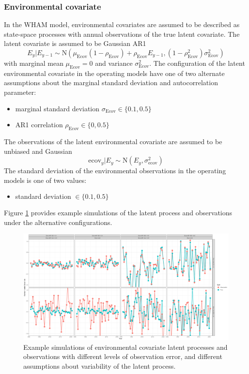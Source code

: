 \documentclass[
  12pt,
]{article}
\begin{document}
\hypertarget{environmental-covariate}{%
\subsubsection*{Environmental covariate}\label{environmental-covariate}}

In the WHAM model, environmental covariates are assumed to be described
as state-space processes with annual observations of the true latent
covariate. The latent covariate is assumed to be Gaussian AR1 \[
E_y|E_{y-1} \sim \text{N}\left(\mu_\text{Ecov}\left(1-\rho_\text{Ecov}\right) + \rho_\text{Ecov} E_{y-1}, \left(1-\rho_\text{Ecov}^2\right)\sigma^2_\text{Ecov}\right)
\] with marginal mean \(\mu_\text{Ecov}=0\) and variance
\(\sigma^2_\text{Ecov}\). The configuration of the latent environmental
covariate in the operating models have one of two alternate assumptions
about the marginal standard deviation and autocorrelation parameter:

\begin{itemize}
\item marginal standard deviation $\sigma_\text{Ecov} \in \{0.1, 0.5\}$
\item AR1 correlation $\rho_\text{Ecov} \in \{0, 0.5\}$
\end{itemize}

The observations of the latent environmental covariate are assumed to be
unbiased and Gaussian \[
\text{ecov}_y|E_y \sim \text{N}\left(E_y,\sigma^2_\text{ecov}\right)
\] The standard deviation of the environmental observations in the
operating models is one of two values:

\begin{itemize}
\item standard deviation $\in \{0.1, 0.5\}$
\end{itemize}

Figure \ref{om_ecov_example} provides example simulations of the latent
process and observations under the alternative configurations.

\begin{figure}
\caption{Example simulations of environmental covariate latent processes and observations with different levels of observation error, and different assumptions about variability of the latent process.}\label{om_ecov_example}
\begin{center}
\includegraphics[width = \textwidth]{Ecov_true_obs_example.png}
\end{center}
\end{figure}
\end{document}
